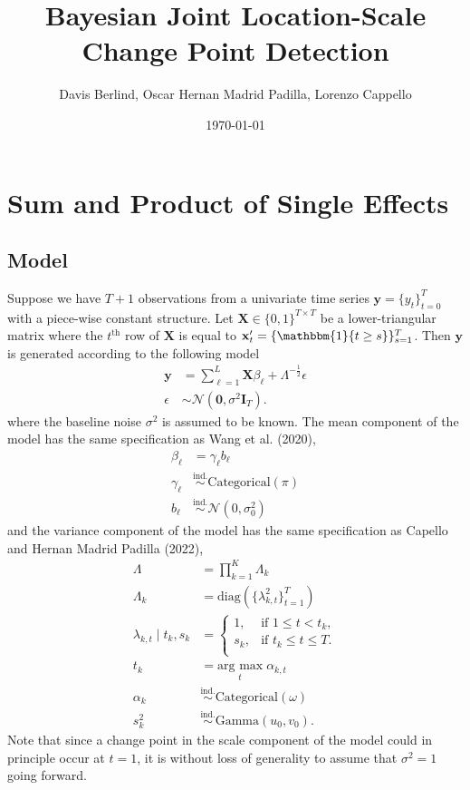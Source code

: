 \documentclass{article}
\title{Bayesian Joint Location-Scale Change Point Detection}
\author{Davis Berlind, Oscar Hernan Madrid Padilla, Lorenzo Cappello}
\date{\today}
\newcommand{\argmax}[1]{\underset{#1}{\text{arg max}}}
\begin{document}
\maketitle

\section{Sum and Product of Single Effects}

\subsection{Model}

Suppose we have $T+1$ observations from a univariate time series $\mathbf{y} = \{y_t\}_{t=0}^T$ with a piece-wise constant structure. Let $\mathbf{X} \in \{0,1\}^{T \times T}$ be a lower-triangular matrix where the $t^\text{th}$ row of $\mathbf{X}$ is equal to $\mathbf{x}'_t = \{\mathbbm{1}\{t \geq s\}\}_{s=1}^T$. Then $\mathbf{y}$ is generated according to the following model
\begin{align*}
    \mathbf{y} &= \sum_{\ell=1}^L \mathbf{X} \beta_\ell + \Lambda^{-\frac{1}{2}} \epsilon \\
    \epsilon &\sim \mathcal{N}(\mathbf{0}, \sigma^2 \mathbf{I}_T).
\end{align*}
where the baseline noise $\sigma^2$ is assumed to be known. The mean component of the model has the same specification as Wang et al. (2020),
\begin{align*}
    \beta_\ell &= \gamma_\ell b_\ell \\
    \gamma_\ell &\overset{\text{ind.}}{\sim} \text{Categorical}(\pi) \\
    b_\ell &\overset{\text{ind.}}{\sim} \mathcal{N}(0,\sigma_0^2) 
\end{align*}
and the variance component of the model has the same specification as Capello and Hernan Madrid Padilla (2022), 
\begin{align*}    
    \Lambda &= \prod_{k=1}^K \Lambda_k\\
    \Lambda_{k} &= \text{diag}(\{\lambda^2_{k,t}\}_{t=1}^T) \\
    \lambda_{k,t} \;|\; t_k, s_k &= 
    \begin{cases}
        1, & \text{if } 1 \leq t < t_k, \\
        s_k,  & \text{if } t_k \leq t \leq T. \\
    \end{cases} \\
    t_k &= \argmax{t} \;\alpha_{k,t} \\
    \alpha_k &\overset{\text{ind.}}{\sim} \text{Categorical}(\omega) \\
    s_k^2 &\overset{\text{ind.}}{\sim} \text{Gamma}(u_0, v_0).
\end{align*} 
Note that since a change point in the scale component of the model could in principle occur at $t = 1$, it is without loss of generality to assume that $\sigma^2 = 1$ going forward.
\end{document}
